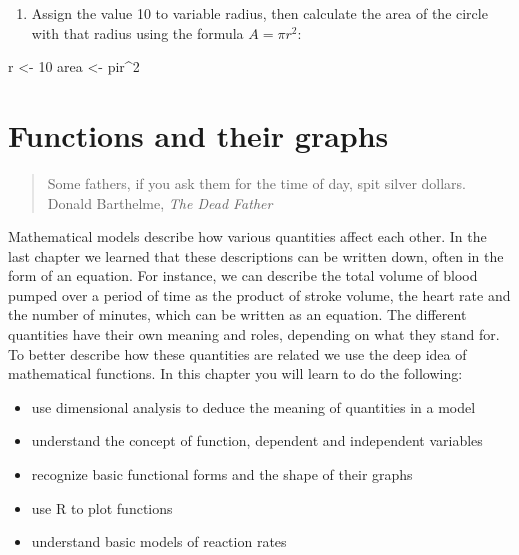 \documentclass[
]{book}
\newenvironment{Shaded}{\begin{snugshade}}{\end{snugshade}}
\newcommand{\DecValTok}[1]{\textcolor[rgb]{0.00,0.00,0.81}{#1}}
\newcommand{\NormalTok}[1]{#1}
\newcommand{\OperatorTok}[1]{\textcolor[rgb]{0.81,0.36,0.00}{\textbf{#1}}}
\newcommand{\StringTok}[1]{\textcolor[rgb]{0.31,0.60,0.02}{#1}}
\providecommand{\tightlist}{%
  \setlength{\itemsep}{0pt}\setlength{\parskip}{0pt}}
\begin{document}
\begin{enumerate}
\def\labelenumi{\arabic{enumi}.}
\setcounter{enumi}{8}
\tightlist
\item
  Assign the value 10 to variable radius, then calculate the area of the circle with that radius using the formula \(A = \pi r^2\):
\end{enumerate}

\begin{Shaded}
\begin{Highlighting}[]
\NormalTok{r \textless{}{-}}\StringTok{ }\DecValTok{10}
\NormalTok{area \textless{}{-}}\StringTok{ }\NormalTok{pir}\OperatorTok{\^{}}\DecValTok{2} 
\end{Highlighting}
\end{Shaded}

\hypertarget{functions-and-their-graphs}{%
\chapter{Functions and their graphs}\label{functions-and-their-graphs}}

\begin{quote}
Some fathers, if you ask them for the time of day, spit silver dollars.\\
Donald Barthelme, \emph{The Dead Father}
\end{quote}

Mathematical models describe how various quantities affect each other. In the last chapter we learned that these descriptions can be written down, often in the form of an equation. For instance, we can describe the total volume of blood pumped over a period of time as the product of stroke volume, the heart rate and the number of minutes, which can be written as an equation. The different quantities have their own meaning and roles, depending on what they stand for. To better describe how these quantities are related we use the deep idea of mathematical functions. In this chapter you will learn to do the following:

\begin{itemize}
\tightlist
\item
  use dimensional analysis to deduce the meaning of quantities in a model
\item
  understand the concept of function, dependent and independent variables
\item
  recognize basic functional forms and the shape of their graphs
\item
  use R to plot functions
\item
  understand basic models of reaction rates
\end{itemize}
\end{document}
